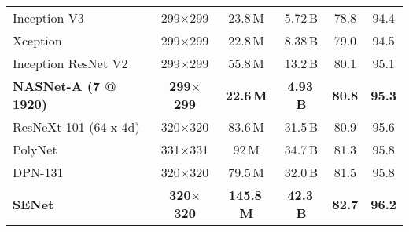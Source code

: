 \documentclass[10pt,twocolumn,letterpaper]{article}
\begin{document}
\begin{table*}[h!]
\begin{tabular}{lc|cc|cc}
\midrule
Inception V3~\cite{szegedy2016rethinking} & 299$\times$299 & 23.8\,M & 5.72\,B & 78.8 & 94.4 \\
Xception~\cite{chollet2016xception}& 299$\times$299 & 22.8\,M & 8.38\,B & 79.0 & 94.5 \\
Inception ResNet V2~\cite{szegedy2016inception} & 299$\times$299 & 55.8\,M & 13.2\,B & 80.1 & 95.1 \\
\textbf{NASNet-A (7 @ 1920)} & \textbf{299$\times$299} & \textbf{22.6\,M} & \textbf{4.93\,B} & \textbf{80.8} & \textbf{95.3} \\
\midrule
ResNeXt-101 (64 x 4d)~\cite{xie2016aggregated} & 320$\times$320 & 83.6\,M & 31.5\,B & 80.9 & 95.6 \\
PolyNet~\cite{zhang2016polynet} & 331$\times$331 & 92\,M & 34.7\,B & 81.3 & 95.8 \\
DPN-131~\cite{dualpath} & 320$\times$320 & 79.5\,M & 32.0\,B & 81.5 & 95.8 \\
{\bf SENet~\cite{hu2017squeeze}}& {\bf 320$\times$320} & {\bf 145.8\,M} & {\bf 42.3\,B} & {\bf 82.7} & {\bf 96.2} \\


\end{tabular}
\end{table*}
\end{document}
